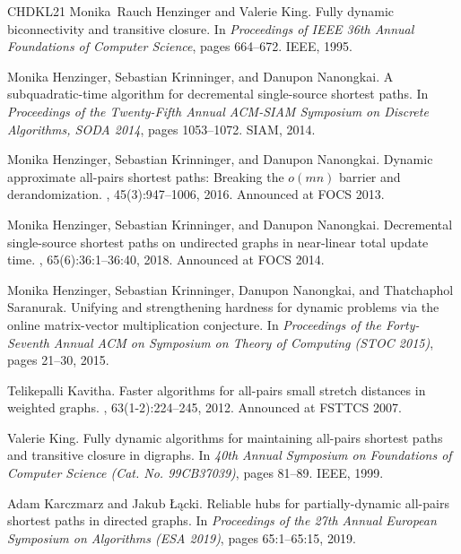 \documentclass[11pt]{article}
\theoremstyle{definition}
\theoremstyle{remark}
\begin{document}
\begin{thebibliography}{CHDKL21}
Monika~Rauch Henzinger and Valerie King.
\newblock Fully dynamic biconnectivity and transitive closure.
\newblock In {\em Proceedings of IEEE 36th Annual Foundations of Computer
  Science}, pages 664--672. IEEE, 1995.

Monika Henzinger, Sebastian Krinninger, and Danupon Nanongkai.
\newblock A subquadratic-time algorithm for decremental single-source shortest
  paths.
\newblock In {\em Proceedings of the Twenty-Fifth Annual {ACM-SIAM} Symposium
  on Discrete Algorithms, {SODA} 2014}, pages 1053--1072. {SIAM}, 2014.

Monika Henzinger, Sebastian Krinninger, and Danupon Nanongkai.
\newblock Dynamic approximate all-pairs shortest paths: Breaking the $o(mn)$
  barrier and derandomization.
, 45(3):947--1006, 2016.
\newblock Announced at {FOCS} 2013.

Monika Henzinger, Sebastian Krinninger, and Danupon Nanongkai.
\newblock Decremental single-source shortest paths on undirected graphs in
  near-linear total update time.
, 65(6):36:1--36:40, 2018.
\newblock Announced at {FOCS} 2014.

Monika Henzinger, Sebastian Krinninger, Danupon Nanongkai, and Thatchaphol
  Saranurak.
\newblock Unifying and strengthening hardness for dynamic problems via the
  online matrix-vector multiplication conjecture.
\newblock In {\em Proceedings of the Forty-Seventh Annual {ACM} on Symposium on
  Theory of Computing ({STOC} 2015)}, pages 21--30, 2015.

Telikepalli Kavitha.
\newblock Faster algorithms for all-pairs small stretch distances in weighted
  graphs.
, 63(1-2):224--245, 2012.
\newblock Announced at {FSTTCS} 2007.

Valerie King.
\newblock Fully dynamic algorithms for maintaining all-pairs shortest paths and
  transitive closure in digraphs.
\newblock In {\em 40th Annual Symposium on Foundations of Computer Science
  (Cat. No. 99CB37039)}, pages 81--89. IEEE, 1999.

Adam Karczmarz and Jakub {\L}ącki.
\newblock Reliable hubs for partially-dynamic all-pairs shortest paths in
  directed graphs.
\newblock In {\em Proceedings of the 27th Annual European Symposium on
  Algorithms ({ESA} 2019)}, pages 65:1--65:15, 2019.


\end{thebibliography}
\end{document}
